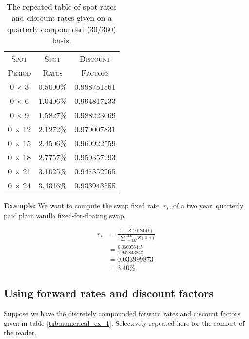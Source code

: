 \begin{table}[ht]
\begin{center}
\begin{tabular}{ccc}

\toprule
\textsc{Spot} & \textsc{Spot} & \textsc{Discount} \\
\textsc{Period} & \textsc{Rates} & \textsc{Factors}\\
\toprule

0 $\times$ 3 & 0.5000\% & 0.998751561 \\
0 $\times$ 6 & 1.0406\% & 0.994817233 \\
0 $\times$ 9 & 1.5827\% & 0.988223069 \\
0 $\times$ 12 & 2.1272\% & 0.979007831 \\
0 $\times$ 15 & 2.4506\% & 0.969922559 \\
0 $\times$ 18 & 2.7757\% & 0.959357293 \\
0 $\times$ 21 & 3.1025\% & 0.947352265 \\
0 $\times$ 24 & 3.4316\% & 0.933943555 \\
\toprule

\end{tabular}
\end{center}
\caption[Numerical Example--Swap Pricing using Discount Factors]{The repeated table of spot rates and discount rates given on a quarterly compounded (30/360) basis.}
\label{tab:numerical_ex_3}
\end{table}

\textbf{Example:}
We want to compute the swap fixed rate, $r_s$, of a two year, quarterly paid plain vanilla fixed-for-floating swap. 

\begin{align}
    r_s &= \frac{1 - Z(0,24M)}{\tau \sum_{i = 3M}^{24M} Z(0, i)} \\[6pt]
    &= \frac{0.066056445}{1.942843842} \\
    &= 0.033999873 \\
    &= 3.40\%.
\end{align}

\subsection{Using forward rates and discount factors}

Suppose we have the discretely compounded forward rates and discount factors given in table \ref{tab:numerical_ex_1}. Selectively repeated here for the comfort of the reader.

